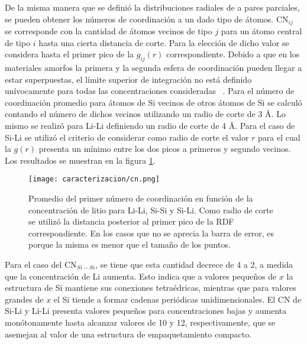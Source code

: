 De la misma manera que se definió la distribuciones radiales de a pares parciales,
se pueden obtener los números de coordinación a un dado tipo de átomos. CN$_{ij}$
se corresponde con la cantidad de átomos vecinos de tipo $j$ para un átomo central 
de tipo $i$ hasta una cierta distancia de corte. Para la elección de dicho valor 
se considera hasta el primer pico de la $g_{ij}(r)$ correspondiente. Debido a que 
en los materiales amorfos la primera y la segunda esfera de coordinación pueden 
llegar a estar superpuestas, el límite superior de integración no está definido 
unívocamente para todas las concentraciones consideradas ~\cite{lamparter1995}.
Para el número de coordinación promedio para átomos de Si vecinos de otros átomos 
de Si se calculó contando el número de dichos vecinos utilizando un radio de 
corte de 3 \AA. Lo mismo se realizó para Li-Li definiendo un radio de corte de 
4 \AA. Para el caso de Si-Li se utilizó el criterio de considerar como radio de 
corte el valor $r$ para el cual la $g(r)$ presenta un mínimo entre los dos picos
a primeros y segundo vecinos. Los resultados se muestran en la figura 
\ref{fig:cn1}.
\begin{figure}[th]
    \centering
    \texttt{[image: caracterizacion/cn.png]}
    \caption{Promedio del primer número de coordinación en función de la 
    concentración de litio para Li-Li, Si-Si y Si-Li. Como radio de corte se 
    utilizó la distancia posterior al primer pico de la RDF correspondiente. En 
    los casos que no se aprecia la barra de error, es porque la misma es menor 
    que el tamaño de los puntos.}
    \label{fig:cn1}
\end{figure}

Para el caso del CN$_{Si-Si}$, se tiene que esta cantidad decrece de 4 a 2, a 
medida que la concentración de Li aumenta. Esto indica que a valores pequeños de 
$x$ la estructura de Si mantiene sus conexiones tetraédricas, mientras que para
valores grandes de $x$ el Si tiende a formar cadenas periódicas unidimensionales.
El CN de Si-Li y Li-Li presenta valores pequeños para concentraciones bajas y 
aumenta monótonamente hasta alcanzar valores de 10 y 12, respectivamente, que se
asemejan al valor de una estructura de empaquetamiento compacto.

